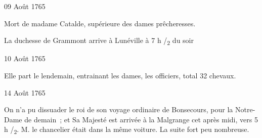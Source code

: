                      \begin{diary}{09 Août 1765}{}
                        
                         Mort de madame Catalde, supérieure des
                           dames prêcheresses. \bigskip
        
        
                        
                           La duchesse de Grammont
                           arrive à Lunéville
                           à 7 h /\textsubscript{2} du soir \bigskip
        
        
                     \end{diary}

                     \begin{diary}{10 Août 1765}{}
                        
                         Elle part le lendemain, entrainant les
                           dames,
                           les officiers, total 32 chevaux. \bigskip
        
        
                     \end{diary}

                     \begin{diary}{14 Août 1765}{}
                        
                         On n'a pu dissuader le roi de son voyage
                           ordinaire de Bonsecours, pour la Notre-Dame de
                           demain ; et Sa Majesté est arrivée à la
                              Malgrange
                           cet après midi, vers 5 h /\textsubscript{2}. M. le chancelier
                           était dans la même voiture. La suite fort
                           peu nombreuse. \bigskip
        
        
                     \end{diary}
                     
                     

